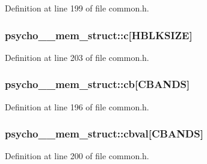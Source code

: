 Definition at line 199 of file common.\+h.

\subsubsection[{\texorpdfstring{c}{c}}]{ psycho\+\_\+\_\+mem\+\_\+struct\+::c\mbox{[}{\bf H\+B\+L\+K\+S\+I\+ZE}\mbox{]}}\hypertarget{structpsycho__4__mem__struct_a0bfa1b466120ff56666908a4af2a903d}{}\label{structpsycho__4__mem__struct_a0bfa1b466120ff56666908a4af2a903d}


Definition at line 203 of file common.\+h.

\subsubsection[{\texorpdfstring{cb}{cb}}]{ psycho\+\_\+\_\+mem\+\_\+struct\+::cb\mbox{[}{\bf C\+B\+A\+N\+DS}\mbox{]}}\hypertarget{structpsycho__4__mem__struct_a96fb801cb16f1fac801e2b8dd1ce9238}{}\label{structpsycho__4__mem__struct_a96fb801cb16f1fac801e2b8dd1ce9238}


Definition at line 196 of file common.\+h.

\subsubsection[{\texorpdfstring{cbval}{cbval}}]{ psycho\+\_\+\_\+mem\+\_\+struct\+::cbval\mbox{[}{\bf C\+B\+A\+N\+DS}\mbox{]}}\hypertarget{structpsycho__4__mem__struct_ac1a5c37925f4dc4910003541bef8c7ec}{}\label{structpsycho__4__mem__struct_ac1a5c37925f4dc4910003541bef8c7ec}


Definition at line 200 of file common.\+h.

